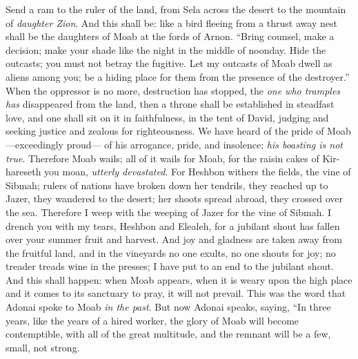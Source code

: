 \begin{biblechapter} %
\verse Send a ram to the ruler of the land, 
from Sela across the desert to the mountain of \textit{daughter Zion}.
\verse And this shall be:
\verse like a bird fleeing from a thrust away nest 
shall be the daughters of Moab at the fords of Arnon.
\verse “Bring counsel, 
make a decision; 
make your shade like the night 
in the middle of noonday. 
Hide the outcasts; 
you must not betray the fugitive.
\verse Let my outcasts of Moab dwell as aliens among you; 
be a hiding place for them from the presence of the destroyer.” 
When the oppressor is no more, destruction has stopped, 
the \textit{one who tramples has} disappeared from the land,
\verse then a throne shall be established in steadfast love, 
and one shall sit on it in faithfulness, in the tent of David, 
judging and seeking justice 
and zealous for righteousness.
\verse We have heard of the pride of Moab—exceedingly proud— 
of his arrogance, pride, and insolence; \textit{his boasting is not true}.
\verse Therefore Moab wails; 
all of it wails for Moab, 
for the raisin cakes of Kir-hareseth you moan, \textit{utterly devastated}.
\verse For Heshbon withers the fields, the vine of Sibmah; 
rulers of nations have broken down her tendrils, 
they reached up to Jazer, 
they wandered to the desert; 
her shoots spread abroad, 
they crossed over the sea.
\verse Therefore I weep with the weeping of Jazer for the vine of Sibmah. 
I drench you with my tears, Heshbon and Elealeh, 
for a jubilant shout has fallen over your summer fruit and harvest.
\verse And joy and gladness are taken away from the fruitful land, 
and in the vineyards no one exults, 
no one shouts for joy; 
no treader treads wine in the presses; 
I have put to an end to the jubilant shout.
\verse And this shall happen: when Moab appears, when it is weary upon the high place 
and it comes to its sanctuary to pray, it will not prevail.
\verse This was the word that Adonai spoke to Moab \textit{in the past}.
\verse But now Adonai speaks, saying, “In three years, like the years of a hired worker, the glory of Moab will become contemptible, with all of the great multitude, and the remnant will be a few, small, not strong.
\end{biblechapter}

